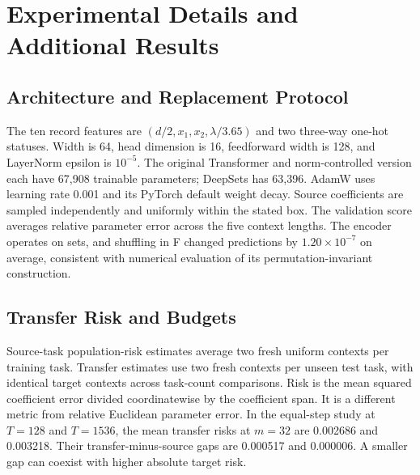 \documentclass{article}
\begin{document}
\section{Experimental Details and Additional Results}
\label{app:details}
\subsection{Architecture and Replacement Protocol}
The ten record features are $(d/2,x_1,x_2,\lambda/3.65)$ and two
three-way one-hot statuses. Width is 64, head dimension is 16,
feedforward width is 128, and LayerNorm epsilon is $10^{-5}$.
The original Transformer and norm-controlled version each have 67,908
trainable parameters; DeepSets has 63,396. AdamW uses learning rate
0.001 and its PyTorch default weight decay. Source coefficients are
sampled independently and uniformly within the stated box. The validation
score averages relative parameter error across the five context lengths.
The encoder operates on sets, and shuffling in F changed predictions
by $1.20\times10^{-7}$ on average, consistent with numerical evaluation
of its permutation-invariant construction.

\begin{table}[h]
\centering

\caption{D, means over three seeds. A valid same-task replacement is
generated independently for each trial. Context lengths use nested
uniform-demand contexts within each task.}
\label{tab:d}
\end{table}

\subsection{Transfer Risk and Budgets}
Source-task population-risk estimates average two fresh uniform contexts
per training task. Transfer estimates use two fresh contexts per unseen
test task, with identical target contexts across task-count comparisons.
Risk is the mean squared coefficient error divided coordinatewise by
the coefficient span. It is a different metric from relative Euclidean
parameter error. In the equal-step study at $T=128$ and $T=1536$,
the mean transfer risks at $m=32$ are 0.002686 and 0.003218.
Their transfer-minus-source gaps are 0.000517 and 0.000006. A smaller
gap can coexist with higher absolute target risk.

\begin{table}[h]
\centering

\caption{E, unseen-task mean relative error at $m=32$.
Equal-step runs allocate 448 updates. All use batch size 32.
Validation selects a checkpoint within the allocated budget.}
\label{tab:e}
\end{table}
\end{document}
